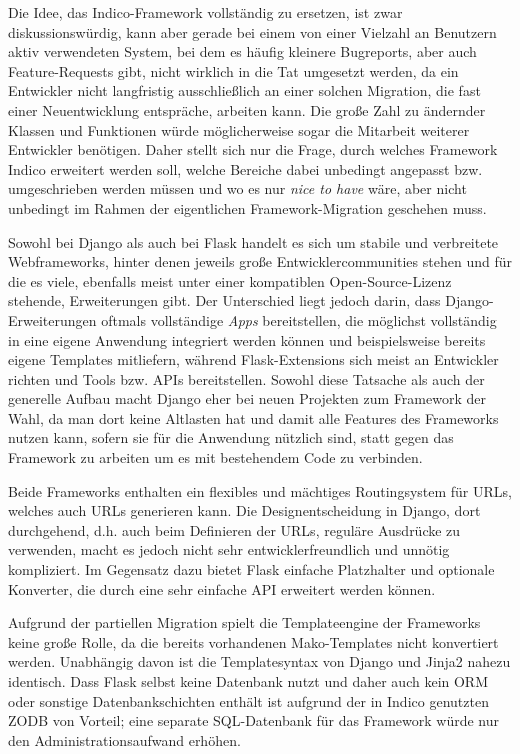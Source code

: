 Die Idee, das Indico-Framework vollständig zu ersetzen, ist zwar diskussionswürdig, kann aber gerade
bei einem von einer Vielzahl an Benutzern aktiv verwendeten System, bei dem es häufig kleinere
Bugreports, aber auch Feature-Requests gibt, nicht wirklich in die Tat umgesetzt werden, da ein
Entwickler nicht langfristig ausschließlich an einer solchen Migration, die fast einer
Neuentwicklung entspräche, arbeiten kann. Die große Zahl zu ändernder Klassen und Funktionen würde
möglicherweise sogar die Mitarbeit weiterer Entwickler benötigen. Daher stellt sich nur die Frage,
durch welches Framework Indico erweitert werden soll, welche Bereiche dabei unbedingt angepasst bzw.
umgeschrieben werden müssen und wo es nur \emph{nice to have} wäre, aber nicht unbedingt im Rahmen
der eigentlichen Framework-Migration geschehen muss.

Sowohl bei Django als auch bei Flask handelt es sich um stabile und verbreitete Webframeworks,
hinter denen jeweils große Entwicklercommunities stehen und für die es viele, ebenfalls meist unter
einer kompatiblen Open-Source-Lizenz stehende, Erweiterungen gibt. Der Unterschied liegt jedoch
darin, dass Django-Erweiterungen oftmals vollständige \emph{Apps} bereitstellen, die möglichst
vollständig in eine eigene Anwendung integriert werden können und beispielsweise bereits eigene
Templates mitliefern, während Flask-Extensions sich meist an Entwickler richten und Tools bzw. APIs
bereitstellen. Sowohl diese Tatsache als auch der generelle Aufbau macht Django eher bei neuen
Projekten zum Framework der Wahl, da man dort keine Altlasten hat und damit alle Features des
Frameworks nutzen kann, sofern sie für die Anwendung nützlich sind, statt gegen das Framework zu
arbeiten um es mit bestehendem Code zu verbinden.

Beide Frameworks enthalten ein flexibles und mächtiges Routingsystem für URLs, welches auch URLs
generieren kann. Die Designentscheidung in Django, dort durchgehend, d.h. auch beim Definieren der
URLs, reguläre Ausdrücke zu verwenden, macht es jedoch nicht sehr entwicklerfreundlich und unnötig
kompliziert. Im Gegensatz dazu bietet Flask einfache Platzhalter und optionale Konverter, die durch
eine sehr einfache API erweitert werden können.

Aufgrund der partiellen Migration spielt die Templateengine der Frameworks keine große Rolle, da
die bereits vorhandenen Mako-Templates nicht konvertiert werden. Unabhängig davon ist die
Templatesyntax von Django und Jinja2 nahezu identisch. Dass Flask selbst keine Datenbank nutzt und
daher auch kein ORM oder sonstige Datenbankschichten enthält ist aufgrund der in Indico genutzten
ZODB von Vorteil; eine separate SQL-Datenbank für das Framework würde nur den Administrationsaufwand
erhöhen.

